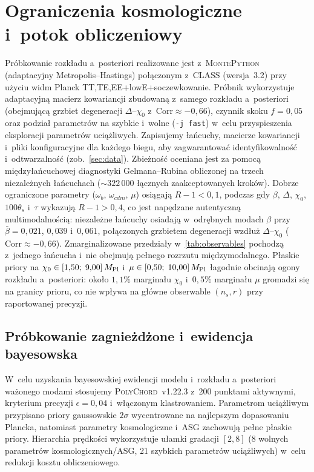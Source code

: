 \documentclass[11pt,a4paper]{article}
\begin{document}
\section{Ograniczenia kosmologiczne i~potok obliczeniowy}
\label{sec:constraints}
Próbkowanie rozkładu a~posteriori realizowane jest z~\textsc{MontePython} (adaptacyjny Metropolis--Hastings) połączonym z~\textsc{CLASS} (wersja~3.2) przy użyciu widm Planck TT,TE,EE+lowE+soczewkowanie. Próbnik wykorzystuje adaptacyjną macierz kowariancji zbudowaną z~samego rozkładu a~posteriori (obejmującą grzbiet degeneracji $\Delta$--$\chi_0$ z~$\mathrm{Corr}\approx-0{,}66$), czynnik skoku $f=0{,}05$ oraz podział parametrów na szybkie i~wolne (\texttt{-j fast}) w~celu przyspieszenia eksploracji parametrów uciążliwych. Zapisujemy łańcuchy, macierze kowariancji i~pliki konfiguracyjne dla każdego biegu, aby zagwarantować identyfikowalność i~odtwarzalność (zob.\ \cref{sec:data}). Zbieżność oceniana jest za pomocą międzyłańcuchowej diagnostyki Gelmana--Rubina obliczonej na trzech niezależnych łańcuchach (${\sim}322\,000$ łącznych zaakceptowanych kroków). Dobrze ograniczone parametry ($\omega_b$, $\omega_{cdm}$, $\mu$) osiągają $R{-}1<0{,}1$, podczas gdy $\beta$, $\Delta$, $\chi_0$, $100\theta_s$ i~$\tau$ wykazują $R{-}1>0{,}4$, co jest napędzane autentyczną multimodalnością: niezależne łańcuchy osiadają w~odrębnych modach $\beta$ przy $\bar\beta=0{,}021$, $0{,}039$ i~$0{,}061$, połączonych grzbietem degeneracji wzdłuż $\Delta$--$\chi_0$ ($\mathrm{Corr}\approx-0{,}66$). Zmarginalizowane przedziały w~\cref{tab:observables} pochodzą z~jednego łańcucha i~nie obejmują pełnego rozrzutu międzymodalnego. Płaskie priory na $\chi_0\in[1{,}50;\;9{,}00]\,M_{\rm Pl}$ i~$\mu\in[0{,}50;\;10{,}00]\,M_{\rm Pl}$ łagodnie obcinają ogony rozkładu a~posteriori: około $1{,}1\%$ marginału $\chi_0$ i~$0{,}5\%$ marginału $\mu$ gromadzi się na granicy prioru, co nie wpływa na główne obserwable $(n_s,r)$ przy raportowanej precyzji.

\subsection{Próbkowanie zagnieżdżone i~ewidencja bayesowska}
\label{sec:evidence}
W~celu uzyskania bayesowskiej ewidencji modelu i~rozkładu a~posteriori ważonego modami stosujemy \textsc{PolyChord}~v1.22.3 \cite{Handley2015a,Handley2015b} z~200 punktami aktywnymi, kryterium precyzji $\epsilon=0{,}04$ i~włączonym klastrowaniem. Parametrom uciążliwym przypisano priory gaussowskie $2\sigma$ wycentrowane na najlepszym dopasowaniu Plancka, natomiast parametry kosmologiczne i~ASG zachowują pełne płaskie priory. Hierarchia prędkości wykorzystuje ułamki gradacji $[2,8]$ (8 wolnych parametrów kosmologicznych/ASG, 21 szybkich parametrów uciążliwych) w~celu redukcji kosztu obliczeniowego.
\end{document}
